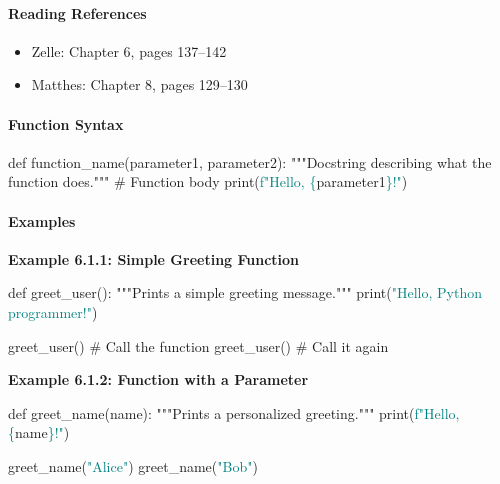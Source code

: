 \documentclass[
  justified,
  openright,
]{tufte-book}
\let\subsubsection\paragraph
\let\paragraph\paragraph
\newcommand{\BuiltInTok}[1]{#1}
\newcommand{\CommentTok}[1]{\textcolor{MidGray}{#1}}
\newcommand{\KeywordTok}[1]{\textcolor{BrandBlue}{#1}}
\newcommand{\NormalTok}[1]{#1}
\newcommand{\SpecialCharTok}[1]{\textcolor{Teal}{#1}}
\newcommand{\SpecialStringTok}[1]{\textcolor{Teal}{#1}}
\newcommand{\StringTok}[1]{\textcolor{Teal}{#1}}
\newenvironment{Shaded}{%
  \begin{snugshade}
}{%
  \end{snugshade}
}
\let\subsubsection\paragraph
\let\paragraph\paragraph
\providecommand{\tightlist}{%
  \setlength{\itemsep}{0pt}\setlength{\parskip}{0pt}}
\begin{document}
\subsubsection{Reading References}\label{reading-references-18}

\begin{itemize}
\tightlist
\item
  Zelle: Chapter 6, pages 137--142
\item
  Matthes: Chapter 8, pages 129--130
\end{itemize}

\subsubsection{Function Syntax}\label{function-syntax}

\begin{Shaded}
\begin{Highlighting}[]
\KeywordTok{def}\NormalTok{ function\_name(parameter1, parameter2):}
    \CommentTok{"""Docstring describing what the function does."""}
    \CommentTok{\# Function body}
    \BuiltInTok{print}\NormalTok{(}\SpecialStringTok{f"Hello, }\SpecialCharTok{\{}\NormalTok{parameter1}\SpecialCharTok{\}}\SpecialStringTok{!"}\NormalTok{)}
\end{Highlighting}
\end{Shaded}

\subsubsection{Examples}\label{examples-12}

\textbf{Example 6.1.1: Simple Greeting Function}

\begin{Shaded}
\begin{Highlighting}[]
\KeywordTok{def}\NormalTok{ greet\_user():}
    \CommentTok{"""Prints a simple greeting message."""}
    \BuiltInTok{print}\NormalTok{(}\StringTok{"Hello, Python programmer!"}\NormalTok{)}

\NormalTok{greet\_user()   }\CommentTok{\# Call the function}
\NormalTok{greet\_user()   }\CommentTok{\# Call it again}
\end{Highlighting}
\end{Shaded}

\textbf{Example 6.1.2: Function with a Parameter}

\begin{Shaded}
\begin{Highlighting}[]
\KeywordTok{def}\NormalTok{ greet\_name(name):}
    \CommentTok{"""Prints a personalized greeting."""}
    \BuiltInTok{print}\NormalTok{(}\SpecialStringTok{f"Hello, }\SpecialCharTok{\{}\NormalTok{name}\SpecialCharTok{\}}\SpecialStringTok{!"}\NormalTok{)}

\NormalTok{greet\_name(}\StringTok{"Alice"}\NormalTok{)}
\NormalTok{greet\_name(}\StringTok{"Bob"}\NormalTok{)}
\end{Highlighting}
\end{Shaded}
\end{document}

